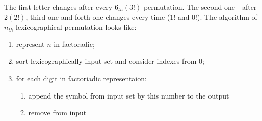 \documentclass{article}
\begin{document}
The first letter changes after every $6_{th} (3!)$ permutation. The second one -
after $2 (2!)$, third one and forth one changes every time ($1!$ and $0!$).
\newline\newline
The algorithm of $n_{th}$ lexicographical permutation looks like:
\begin{enumerate}
    \item represent $n$ in factoradic;
    \item sort lexicographically input set and consider indexes from 0;
    \item for each digit in factoriadic representaion:
    \begin{enumerate}
            \item append the symbol from input set by this number to the output
            \item remove from input
    \end{enumerate}
\end{enumerate} 
\end{document}
